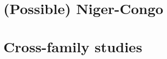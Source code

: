 \documentclass[output=short         
	        ,collection  
	        ,collectionchapter
	        ,collectiontoclongg
 	        ,modfonts,nonflat  
		  ]{langsci/langscibook}                               %
\begin{document}
         
\maketitle                
\frontmatter

\tableofcontents
% 
% 

\mainmatter          



\part{(Possible) Niger-Congo}
% 
% 
% 
% 
% 
% 
% 


\part{Cross-family studies}




\end{document}
